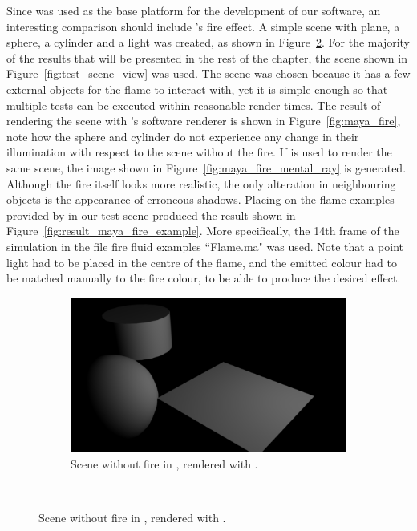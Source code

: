 Since \Maya was used as the base platform for the development of our software, an interesting comparison should include \Mayash's fire effect.
A simple scene with plane, a sphere, a cylinder and a light was created, as shown in Figure~\ref{fig:maya_no_fire_mental_ray}.
For the majority of the results that will be presented in the rest of the chapter, the scene shown in Figure~\ref{fig:test_scene_view} was used.
The scene was chosen because it has a few external objects for the flame to interact with, yet it is simple enough so that multiple tests can be executed within reasonable render times.
The result of rendering the scene with \Mayash's software renderer is shown in Figure~\ref{fig:maya_fire}, note how the sphere and cylinder do not experience any change in their illumination with respect to the scene without the fire.
If \MentalRay is used to render the same scene, the image shown in Figure~\ref{fig:maya_fire_mental_ray} is generated.
Although the fire itself looks more realistic, the only alteration in neighbouring objects  is the appearance of erroneous shadows.
Placing on the flame examples provided by \Maya in our test scene produced the result shown in Figure~\ref{fig:result_maya_fire_example}.
More specifically, the 14th frame of the simulation in the file fire fluid examples ``Flame.ma" was used.
Note that a point light had to be placed in the centre of the flame, and the emitted colour had to be matched manually to the fire colour, to be able to produce the desired effect.

\begin{figure}[htpb]
        \centering
        \begin{subfigure}[t]{\textwidth}
                \includegraphics[width=\textwidth]{img/maya_no_fire_mental_ray}
                \caption{Scene without fire in \Maya, rendered with \MentalRay.}
                 \label{fig:maya_no_fire_mental_ray}
        \end{subfigure}    
        \\     
\end{figure}

